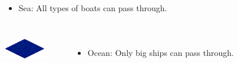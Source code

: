 \begin{frame}
\begin{columns}
		\begin{itemize}
			\item Sea: All types of boats can pass through.
		\end{itemize}
	\end{columns}
	
	\vspace{1em}
	
	\begin{columns}
		\centering \includegraphics[width=0.7\textwidth]{images/ocean.png}
		
		\begin{itemize}
			\item Ocean: Only big ships can pass through.
		\end{itemize}
	\end{columns}
\end{frame}